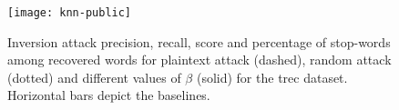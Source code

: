 \begin{figure}[h]
	\centering
	\texttt{[image: knn-public]} %
	\caption[Inversion attack accuracy metrics for different values of $\beta$ for \acrshort{trec} dataset]{
		Inversion attack {\color{MatplotlibOne}precision}, {\color{MatplotlibTwo}recall}, {\color{MatplotlibThree}\FOne{} score} and {\color{MatplotlibFive}percentage of stop-words among recovered words} for plaintext attack (dashed), random attack (dotted) and different values of $\beta$ (solid) for the \acrshort{trec} dataset.
		Horizontal bars depict the baselines.
	}\label{figure:knn-public}
\end{figure}
